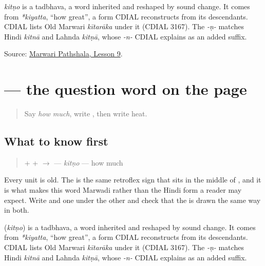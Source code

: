 \begin{cousinweb}
\emph{kitṇo} is a tadbhava, a word inherited and reshaped by sound change. It comes from \emph{*kiyatta}, \textquotedblleft{}how great\textquotedblright{}, a form CDIAL reconstructs from its descendants. CDIAL lists Old Marwari \emph{kītarāka} under it (CDIAL 3167). The \emph{-ṇ-} matches Hindi \emph{kitnā} and Lahnda \emph{kitṇā}, whose \emph{-n-} CDIAL explains as an added suffix.
\end{cousinweb}

\begin{tcolorbox}[breakable,colback=teal!4,colframe=teal!35!black,title={Before you move on}]
Source: \href{https://www.marwaripathshala.com/marwari-lesson-9-english}{Marwari Pathshala, Lesson 9}.
\end{tcolorbox}
\section[\texorpdfstring{\mw{कितणो} (kitṇo)}{कितणो (kitṇo)}]{ — the question word on the page}

\label{lesson:MW-C22-kitno}



\begin{quote}
Say \emph{how much}, write \textbf{}, then write heat.
\end{quote}

\subsection*{What to know first}
\begin{quote}
\textbf{} + \textbf{} + \textbf{} $\to$ \textbf{} — \emph{kitṇo} — how much
\end{quote}

Every unit is old. The \textbf{} is the same retroflex sign that sits in the middle of \textbf{}, and it is what makes this word Marwadi rather than the Hindi form a reader may expect. Write \textbf{} and \textbf{} one under the other and check that the \textbf{} is drawn the same way in both.

\begin{cousinweb}
\textbf{} (\emph{kitṇo}) is a tadbhava, a word inherited and reshaped by sound change. It comes from \emph{*kiyatta}, \textquotedblleft{}how great\textquotedblright{}, a form CDIAL reconstructs from its descendants. CDIAL lists Old Marwari \emph{kītarāka} under it (CDIAL 3167). The \emph{-ṇ-} matches Hindi \emph{kitnā} and Lahnda \emph{kitṇā}, whose \emph{-n-} CDIAL explains as an added suffix.
\end{cousinweb}

